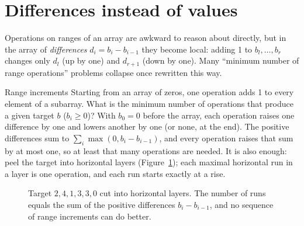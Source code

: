\section[Differences instead of values]{Differences instead of values \hfill \silver}\label{sec:differences}

Operations on ranges of an array are awkward to reason about directly, but in the array of \emph{differences}
$d_i = b_i - b_{i-1}$ they become local: adding 1 to $b_l, \dots, b_r$ changes only $d_l$ (up by one) and $d_{r+1}$ (down by
one). Many ``minimum number of range operations'' problems collapse once rewritten this way.

\begin{problem}{Range increments}
Starting from an array of zeros, one operation adds 1 to every element of a subarray. What is the minimum number of
operations that produce a given target $b$ ($b_i \ge 0$)?
\solution With $b_0 = 0$ before the array, each operation raises one difference by one and lowers another by one (or none,
at the end). The positive differences sum to $\sum_i \max(0, b_i - b_{i-1})$, and every operation raises that sum by at most
one, so at least that many operations are needed. It is also enough: peel the target into horizontal layers
(Figure~\ref{fig:differences}); each maximal horizontal run in a layer is one operation, and each run starts exactly at a
rise.
\end{problem}

\begin{figure}[htbp]
\centering
{}
\caption{Target $2, 4, 1, 3, 3, 0$ cut into horizontal layers. The number of runs equals the sum of the positive
differences $b_i - b_{i-1}$, and no sequence of range increments can do better.}
\label{fig:differences}
\end{figure}

